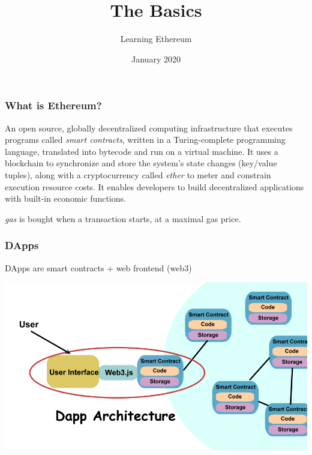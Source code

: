 \documentclass[11pt]{beamer}  %
\subtitle{Learning Ethereum}
\title{The Basics}
\institute{Universit\`a di Verona, Italy}
\date{January 2020}
\begin{document}
\begin{frame}
  \titlepage
\end{frame}

\begin{frame}
  \frametitle{What is Ethereum?}

  \begin{greenbox}{}
    An open source, globally decentralized computing infrastructure
    that executes programs called \emph{smart contracts}, written
    in a Turing-complete programming language, translated into
    bytecode and run on a virtual machine. It uses a
    blockchain to synchronize and store the system's state changes
    (key/value tuples), along
    with a cryptocurrency called \emph{ether} to meter and constrain
    execution resource costs. It enables developers to build
    decentralized applications with built-in economic functions.
  \end{greenbox}

  \bigskip
  
  \emph{gas} is bought when a transaction starts, at a maximal gas price.
  
\end{frame}

\begin{frame}\frametitle{DApps}

  \begin{greenbox}{DApps are smart contracts + web frontend (web3)}
    \begin{center}
      \includegraphics[width=\textwidth,clip=false]{pictures/dapps.png}
    \end{center}
  \end{greenbox}

\end{frame}
\end{document}
